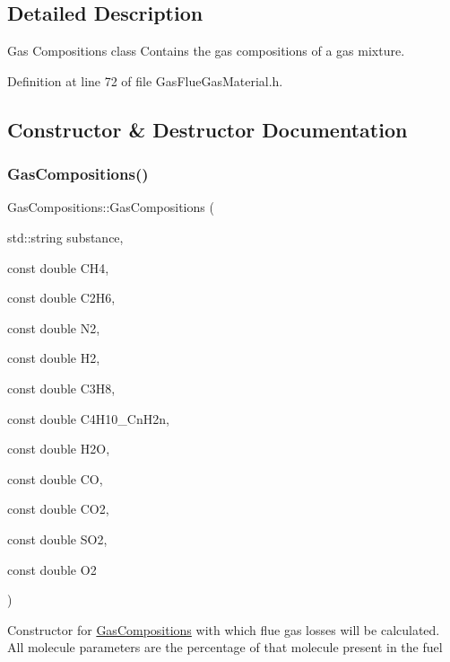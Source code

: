 \subsection{Detailed Description}
Gas Compositions class Contains the gas compositions of a gas mixture. 

Definition at line 72 of file Gas\+Flue\+Gas\+Material.\+h.



\subsection{Constructor \& Destructor Documentation}
\mbox{\label{class_gas_compositions_ad0021d4285883374f8904f9465e41920}} 
\subsubsection{\texorpdfstring{Gas\+Compositions()}{GasCompositions()}}
{\footnotesize\ttfamily Gas\+Compositions\+::\+Gas\+Compositions (\begin{DoxyParamCaption}\item[{std\+::string}]{substance,  }\item[{const double}]{C\+H4,  }\item[{const double}]{C2\+H6,  }\item[{const double}]{N2,  }\item[{const double}]{H2,  }\item[{const double}]{C3\+H8,  }\item[{const double}]{C4\+H10\+\_\+\+Cn\+H2n,  }\item[{const double}]{H2O,  }\item[{const double}]{CO,  }\item[{const double}]{C\+O2,  }\item[{const double}]{S\+O2,  }\item[{const double}]{O2 }\end{DoxyParamCaption})\hspace{0.3cm}{\ttfamily [inline]}}

Constructor for \hyperlink{class_gas_compositions}{Gas\+Compositions} with which flue gas losses will be calculated. All molecule parameters are the percentage of that molecule present in the fuel


